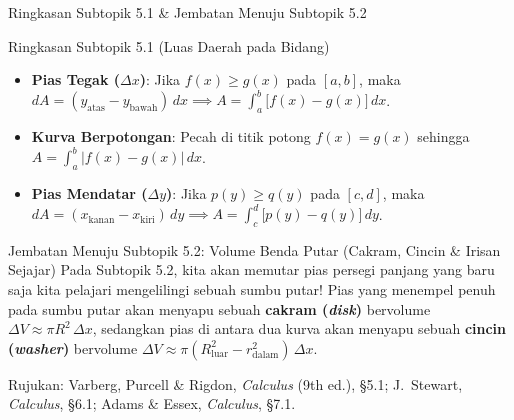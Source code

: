 \documentclass[aspectratio=43,10pt]{beamer}
\begin{document}
\begin{frame}{Ringkasan Subtopik 5.1 \& Jembatan Menuju Subtopik 5.2}
    \begin{block}{Ringkasan Subtopik 5.1 (Luas Daerah pada Bidang)}
        \scriptsize
        \begin{itemize}\itemsep=2pt
            \item \textbf{Pias Tegak ($\Delta x$)}: Jika $f(x) \ge g(x)$ pada $[a, b]$, maka $\displaystyle dA = (y_{\text{atas}} - y_{\text{bawah}})\,dx \implies A = \int_{a}^{b} \big[f(x) - g(x)\big]\,dx$.
            \item \textbf{Kurva Berpotongan}: Pecah di titik potong $f(x) = g(x)$ sehingga $\displaystyle A = \int_{a}^{b} \big|f(x) - g(x)\big|\,dx$.
            \item \textbf{Pias Mendatar ($\Delta y$)}: Jika $p(y) \ge q(y)$ pada $[c, d]$, maka $\displaystyle dA = (x_{\text{kanan}} - x_{\text{kiri}})\,dy \implies A = \int_{c}^{d} \big[p(y) - q(y)\big]\,dy$.
        \end{itemize}
    \end{block}

    \begin{alertblock}{Jembatan Menuju Subtopik 5.2: Volume Benda Putar (Cakram, Cincin \& Irisan Sejajar)}
        \scriptsize
        Pada Subtopik 5.2, kita akan memutar pias persegi panjang yang baru saja kita pelajari mengelilingi sebuah sumbu putar! Pias yang menempel penuh pada sumbu putar akan menyapu sebuah \textbf{cakram (\textit{disk})} bervolume $\Delta V \approx \pi R^2\,\Delta x$, sedangkan pias di antara dua kurva akan menyapu sebuah \textbf{cincin (\textit{washer})} bervolume $\Delta V \approx \pi(R_{\text{luar}}^2 - r_{\text{dalam}}^2)\,\Delta x$.
    \end{alertblock}

    \vskip 2pt
    \tiny\color{SoftGray}
    Rujukan: Varberg, Purcell \& Rigdon, \textit{Calculus} (9th ed.), \S5.1; J.~Stewart, \textit{Calculus}, \S6.1; Adams \& Essex, \textit{Calculus}, \S7.1.
\end{frame}
\end{document}
